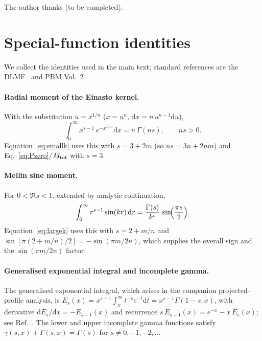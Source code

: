 \documentclass[aps,prd,onecolumn]{revtex4-2}
\begin{document}
\begin{acknowledgments}
The author thanks (to be completed).
\end{acknowledgments}

\appendix

\section{Special-function identities}
\label{app:special}

We collect the identities used in the main text; standard references are
the DLMF~\cite{DLMF} and PBM Vol.~2~\cite{PBM2}.

\paragraph*{Radial moment of the Einasto kernel.}
With the substitution $u=x^{1/n}$ ($x=u^{n}$,
$\mathrm{d}x=n\,u^{n-1}\mathrm{d}u$),
\begin{equation}
\int_0^\infty x^{s-1}\,e^{-x^{1/n}}\,\mathrm{d}x
=n\,\Gamma(ns),
\qquad ns>0 .
\label{eq:moment}
\end{equation}
Equation~\eqref{eq:smallk} uses this with $s=3+2m$ (so $ns=3n+2nm$) and
Eq.~\eqref{eq:Pzero}/$M_{\rm tot}$ with $s=3$.

\paragraph*{Mellin sine moment.}
For $0<\Re s<1$, extended by analytic continuation,
\begin{equation}
\int_0^\infty r^{s-1}\sin(kr)\,\mathrm{d}r
=\frac{\Gamma(s)}{k^{s}}\,\sin\!\Bigl(\frac{\pi s}{2}\Bigr).
\label{eq:sinemoment}
\end{equation}
Equation~\eqref{eq:largek} uses this with $s=2+m/n$ and
$\sin[\pi(2+m/n)/2]=-\sin(\pi m/2n)$, which supplies the overall sign and
the $\sin(\pi m/2n)$ factor.

\paragraph*{Generalised exponential integral and incomplete gamma.}
The generalised exponential integral, which arises in the companion
projected-profile analysis, is
$E_s(x)=x^{s-1}\int_x^\infty t^{-s}e^{-t}\mathrm{d}t=x^{s-1}\Gamma(1-s,x)$,
with derivative $\mathrm{d}E_s/\mathrm{d}x=-E_{s-1}(x)$ and recurrence
$s\,E_{s+1}(x)=e^{-x}-x\,E_{s}(x)$; see Ref.~\cite{DLMF}.  The lower and
upper incomplete gamma functions satisfy
$\gamma(s,x)+\Gamma(s,x)=\Gamma(s)$ for $s\neq0,-1,-2,\dots$
\end{document}
